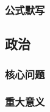 \documentclass[UTF8]{ctexart}
\begin{document}
\subsubsection{公式默写}
\begin{multicols}{2}
\end{multicols}
\subsection{政治}
\subsubsection{}
\subsubsection{核心问题}
\subsubsection{重大意义}
\end{document}
